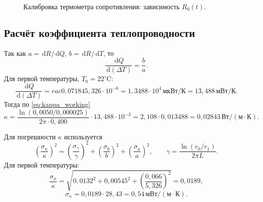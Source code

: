 \documentclass[a4paper,12pt]{article}
\newcommand{\dd}{\,\mathrm{d}}
\begin{document}
\RzeroData

\begin{figure}[H]
\centering
{}
\caption{Калибровка термометра сопротивления: зависимость $R_0(t)$.}
\end{figure}

\subsection{Расчёт коэффициента теплопроводности}
Так как $a=\dd R/\dd Q$, $b=\dd R/\dd T$, то
\[
\frac{\dd Q}{\dd(\Delta T)}=\frac{b}{a}.
\]
Для первой температуры, $T_0=22^\circ\mathrm{C}$:
\[
\frac{\dd Q}{\dd(\Delta T)}=
rac{0{,}07184}{5{,}326\cdot10^{-6}}
=1{,}3488\cdot10^{4}\,\text{мкВт}/\text{К}=13{,}488\,\text{мВт}/\text{К}.
\]
Тогда по \eqref{eq:kappa_working}
\[
\kappa=\frac{\ln(0{,}0050/0{,}000025)}{2\pi\cdot0{,}400}\cdot13{,}488\cdot10^{-3}
=2{,}108\cdot0{,}013488=0{,}02843\,\text{Вт}/(\text{м}\cdot\text{К}).
\]

Для погрешности $\kappa$ используется
\begin{equation}
\left(\frac{\sigma_\kappa}{\kappa}\right)^2=
\left(\frac{\sigma_\gamma}{\gamma}\right)^2+
\left(\frac{\sigma_b}{b}\right)^2+
\left(\frac{\sigma_a}{a}\right)^2,
\qquad
\gamma=\frac{\ln(r_0/r_1)}{2\pi L}.
\label{eq:kappa_uncertainty}
\end{equation}
Для первой температуры:
\[
\frac{\sigma_\kappa}{\kappa}=\sqrt{0{,}0132^2+0{,}00545^2+
\left(\frac{0{,}066}{5{,}326}\right)^2}=0{,}0189,
\]
\[
\sigma_\kappa=0{,}0189\cdot28{,}43=0{,}54\,\text{мВт}/(\text{м}\cdot\text{К}).
\]
\end{document}
